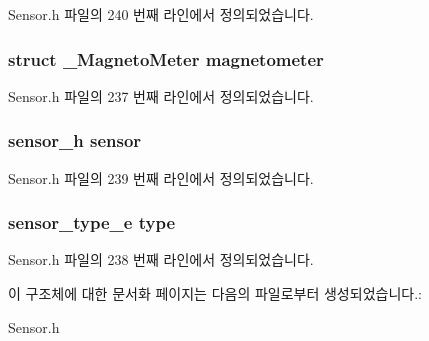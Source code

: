 Sensor.\-h 파일의 240 번째 라인에서 정의되었습니다.

\hypertarget{struct___magneto_meter_extend_a8679591114ee0c09969a82b9bd9f9fe4}{
\subsubsection[{magnetometer}]{\setlength{\rightskip}{0pt plus 5cm}struct {\bf \-\_\-\-Magneto\-Meter} magnetometer}}\label{struct___magneto_meter_extend_a8679591114ee0c09969a82b9bd9f9fe4}


Sensor.\-h 파일의 237 번째 라인에서 정의되었습니다.

\hypertarget{struct___magneto_meter_extend_a5bae9b7801bc3808411925cde81d3f26}{
\subsubsection[{sensor}]{\setlength{\rightskip}{0pt plus 5cm}sensor\-\_\-h sensor}}\label{struct___magneto_meter_extend_a5bae9b7801bc3808411925cde81d3f26}


Sensor.\-h 파일의 239 번째 라인에서 정의되었습니다.

\hypertarget{struct___magneto_meter_extend_abffb09766da2fc510a79bb51f82a36e1}{
\subsubsection[{type}]{\setlength{\rightskip}{0pt plus 5cm}sensor\-\_\-type\-\_\-e type}}\label{struct___magneto_meter_extend_abffb09766da2fc510a79bb51f82a36e1}


Sensor.\-h 파일의 238 번째 라인에서 정의되었습니다.



이 구조체에 대한 문서화 페이지는 다음의 파일로부터 생성되었습니다.\-:\begin{DoxyCompactItemize}
\item 
Sensor.\-h\end{DoxyCompactItemize}
